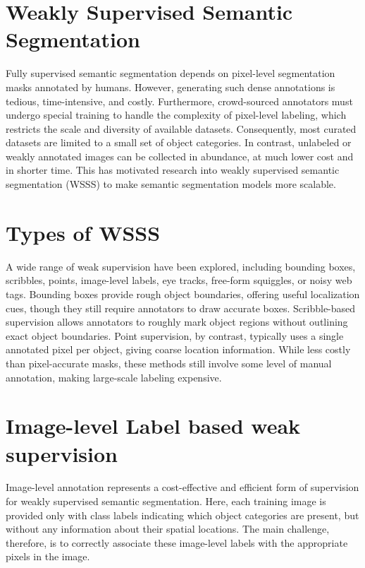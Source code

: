 
\section{Weakly Supervised Semantic Segmentation}
\label{sec:weakly-supervised}
Fully supervised semantic segmentation depends on pixel-level segmentation masks annotated by humans. However, generating such dense annotations is tedious, time-intensive, and costly. Furthermore, crowd-sourced annotators must undergo special training to handle the complexity of pixel-level labeling, which restricts the scale and diversity of available datasets. Consequently, most curated datasets are limited to a small set of object categories. In contrast, unlabeled or weakly annotated images can be collected in abundance, at much lower cost and in shorter time. This has motivated research into weakly supervised semantic segmentation (WSSS) to make semantic segmentation models more scalable.


\section{Types of WSSS}
\label{sec:types-weakly-supervised}
A wide range of weak supervision have been explored, including bounding boxes, scribbles, points, image-level labels,  eye tracks, free-form squiggles, or noisy web tags. Bounding boxes provide rough object boundaries, offering useful localization cues, though they still require annotators to draw accurate boxes.  Scribble-based supervision allows annotators to roughly mark object regions without outlining exact object boundaries. Point supervision, by contrast, typically uses a single annotated pixel per object, giving coarse location information. While less costly than pixel-accurate masks, these methods still involve some level of manual annotation, making large-scale labeling expensive.


\section{Image-level Label based weak supervision}
\label{sec:image-level-label}
Image-level annotation represents a cost-effective and efficient form of supervision for weakly supervised semantic segmentation. Here, each training image is provided only with class labels indicating which object categories are present, but without any information about their spatial locations. The main challenge, therefore, is to correctly associate these image-level labels with the appropriate pixels in the image.


